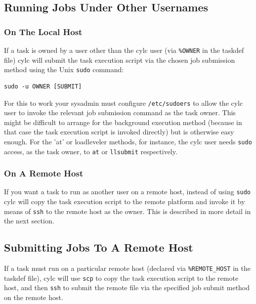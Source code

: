 \documentclass[11pt,a4paper]{article}
\begin{document}
\subsection{Running Jobs Under Other Usernames}
\label{RunningJobsUnderOtherUsernames}

\subsubsection{On The Local Host}

\lstset{language=cylctaskdef}

If a task is owned by a user other than the cylc user (via
\lstinline=%OWNER= in the taskdef file) cylc will submit the task
execution script via the chosen job submission method using the Unix
\lstinline=sudo= command:  

\lstset{language=bash}


\begin{lstlisting}
sudo -u OWNER [SUBMIT]
\end{lstlisting}

For this to work your sysadmin must configure \lstinline=/etc/sudoers=
to allow the cylc user to invoke the relevant job submission command as
the task owner.  This might be difficult to arrange for the background
execution method (because in that case the task execution script is
invoked directly) but is otherwise easy enough. For the 'at' or
loadleveler methods, for instance, the cylc user needs \lstinline=sudo=
access, as the task owner, to \lstinline=at= or \lstinline=llsubmit= 
respectively.

\subsubsection{On A Remote Host}

If you want a task to run as another user on a remote host, instead of
using \lstinline=sudo= cylc will copy the task execution script to the
remote platform and invoke it by means of \lstinline=ssh= to the remote
host as the owner. This is described in more detail in the next section.

\subsection{Submitting Jobs To A Remote Host}
\label{SubmittingJobsToARemoteHost}

If a task must run on a particular remote host (declared via
\lstinline=%REMOTE_HOST= in the taskdef file), cylc will use 
\lstinline=scp= to copy the task execution script to the remote host, 
and then \lstinline=ssh= to submit the remote file via the specified job
submit method on the remote host. 
\end{document}
